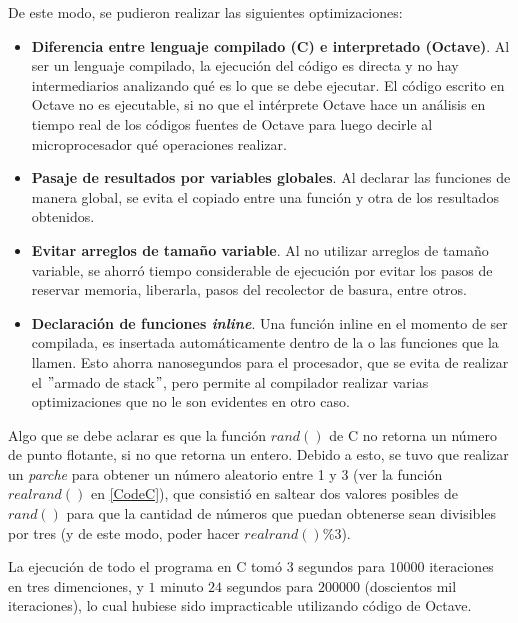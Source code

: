\documentclass[a4paper,10pt]{article}
\begin{document}
De este modo, se pudieron realizar las siguientes optimizaciones:
\begin{itemize}
	\item \textbf{Diferencia entre lenguaje compilado (C) e interpretado (Octave)}. Al ser un lenguaje compilado, la ejecución del 
	c\'odigo es directa y no hay intermediarios analizando qu\'e es lo que se debe ejecutar. El c\'odigo escrito en Octave no es
	ejecutable, si no que el int\'erprete Octave hace un an\'alisis en tiempo real de los c\'odigos fuentes de Octave para luego
	decirle al microprocesador qu\'e operaciones realizar.
	\item \textbf{Pasaje de resultados por variables globales}. Al declarar las funciones de manera global, se evita el copiado 
	entre una funci\'on y otra de los resultados obtenidos.
	\item \textbf{Evitar arreglos de tamaño variable}. Al no utilizar arreglos de tamaño variable, se ahorró tiempo considerable de 
	ejecución por evitar los pasos de reservar memoria, liberarla, pasos del recolector de basura, entre otros.
	\item \textbf{Declaraci\'on de funciones \textit{inline}}. Una funci\'on inline en el momento de ser compilada, es insertada
	autom\'aticamente dentro de la o las funciones que la llamen. Esto ahorra nanosegundos para el procesador, que se evita de 
	realizar el $"$armado de stack$"$, pero permite al compilador realizar varias optimizaciones que no le son evidentes en otro caso.
\end{itemize}

Algo que se debe aclarar es que la funci\'on $rand()$ de C no retorna un n\'umero de punto flotante, si no que retorna un entero.
Debido a esto, se tuvo que realizar un \textit{parche} para obtener un n\'umero aleatorio entre 1 y 3 (ver la funci\'on $realrand()$ en
\ref{CodeC}), que consistió en saltear dos valores posibles de $rand()$ para que la cantidad de n\'umeros que puedan obtenerse sean
divisibles por tres (y de este modo, poder hacer $realrand()\%3$). 

La ejecuci\'on de todo el programa en C tom\'o 3 segundos para $10000$ iteraciones en tres dimenciones, y $1$ minuto $24$ segundos para
$200 000$ (doscientos mil iteraciones), lo cual hubiese sido impracticable utilizando c\'odigo de Octave.
\end{document}
